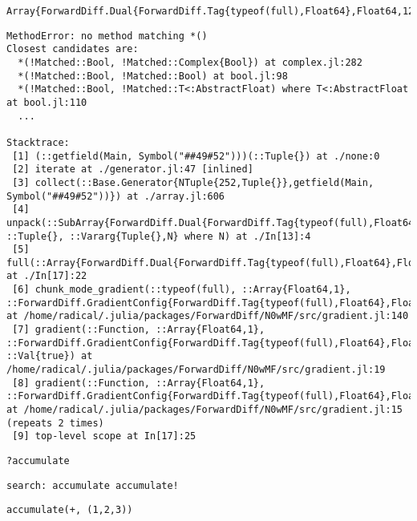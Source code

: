 \documentclass[11pt]{article}
\begin{document}
\begin{verbatim}
Array{ForwardDiff.Dual{ForwardDiff.Tag{typeof(full),Float64},Float64,12},1}
\end{verbatim}

\begin{verbatim}
MethodError: no method matching *()
Closest candidates are:
  *(!Matched::Bool, !Matched::Complex{Bool}) at complex.jl:282
  *(!Matched::Bool, !Matched::Bool) at bool.jl:98
  *(!Matched::Bool, !Matched::T<:AbstractFloat) where T<:AbstractFloat at bool.jl:110
  ...

Stacktrace:
 [1] (::getfield(Main, Symbol("##49#52")))(::Tuple{}) at ./none:0
 [2] iterate at ./generator.jl:47 [inlined]
 [3] collect(::Base.Generator{NTuple{252,Tuple{}},getfield(Main, Symbol("##49#52"))}) at ./array.jl:606
 [4] unpack(::SubArray{ForwardDiff.Dual{ForwardDiff.Tag{typeof(full),Float64},Float64,12},1,Array{ForwardDiff.Dual{ForwardDiff.Tag{typeof(full),Float64},Float64,12},1},Tuple{UnitRange{Int64}},true}, ::Tuple{}, ::Vararg{Tuple{},N} where N) at ./In[13]:4
 [5] full(::Array{ForwardDiff.Dual{ForwardDiff.Tag{typeof(full),Float64},Float64,12},1}) at ./In[17]:22
 [6] chunk_mode_gradient(::typeof(full), ::Array{Float64,1}, ::ForwardDiff.GradientConfig{ForwardDiff.Tag{typeof(full),Float64},Float64,12,Array{ForwardDiff.Dual{ForwardDiff.Tag{typeof(full),Float64},Float64,12},1}}) at /home/radical/.julia/packages/ForwardDiff/N0wMF/src/gradient.jl:140
 [7] gradient(::Function, ::Array{Float64,1}, ::ForwardDiff.GradientConfig{ForwardDiff.Tag{typeof(full),Float64},Float64,12,Array{ForwardDiff.Dual{ForwardDiff.Tag{typeof(full),Float64},Float64,12},1}}, ::Val{true}) at /home/radical/.julia/packages/ForwardDiff/N0wMF/src/gradient.jl:19
 [8] gradient(::Function, ::Array{Float64,1}, ::ForwardDiff.GradientConfig{ForwardDiff.Tag{typeof(full),Float64},Float64,12,Array{ForwardDiff.Dual{ForwardDiff.Tag{typeof(full),Float64},Float64,12},1}}) at /home/radical/.julia/packages/ForwardDiff/N0wMF/src/gradient.jl:15 (repeats 2 times)
 [9] top-level scope at In[17]:25
\end{verbatim}

\begin{verbatim}
?accumulate
\end{verbatim}

\begin{verbatim}
search: accumulate accumulate!
\end{verbatim}

\begin{verbatim}
accumulate(+, (1,2,3))
\end{verbatim}
\end{document}
